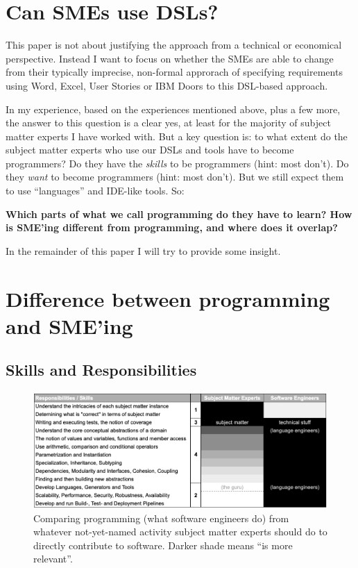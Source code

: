 \documentclass[runningheads]{llncs}
\begin{document}
\section{Can SMEs use DSLs?}

This paper is not about justifying the approach from a technical or economical
perspective. Instead I want to focus on whether the SMEs are able to change from
their typically imprecise, non-formal approrach of specifying requirements using
Word, Excel, User Stories or IBM Doors to this DSL-based approach. 

In my experience, based on the experiences mentioned above, plus a few more, the
answer to this question is a clear yes, at least for the majority
of subject matter experts I have worked with. But a key question is: to what
extent do the subject matter experts who use our DSLs and tools have to become
programmers? Do they have the \emph{skills} to be programmers (hint: most
don't). Do they \emph{want} to become programmers (hint: most don't). But we
still expect them to use ``languages'' and IDE-like tools. So:

\vspace{2mm}
\noindent \textbf{Which parts of what we call programming do they have to learn?
How is SME'ing different from programming, and where does it overlap?}
\vspace{2mm}

\noindent In the remainder of this paper I will try to provide some
insight.

\section{Difference between programming and SME'ing}



\subsection{Skills and Responsibilities}

\begin{figure}[t]
\begin{center}
    \includegraphics[width=1\columnwidth]{figures/table-respo.png}
    \caption{Comparing programming (what software engineers do) from
    whatever not-yet-named activity subject matter experts should do to 
    directly contribute to software. Darker shade means ``is more relevant''.}
    \label{table-respo}
\end{center} 
\end{figure} 
\end{document}
